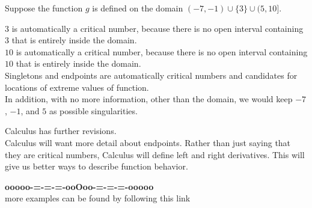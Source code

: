 \documentclass{ximera}
\begin{document}
\begin{example}


Suppose the function $g$ is defined on the domain $(-7, -1) \cup \{ 3 \} \cup (5, 10]$.

$3$ is automatically a critical number, because there is no open interval containing $3$ that is entirely inside the domain.\\

$10$ is automatically a critical number, because there is no open interval containing $10$ that is entirely inside the domain.\\



Singletons and endpoints are automatically critical numbers and candidates for locations of extreme values of function. \\




In addition, with no more information, other than the domain, we would keep $-7$, $-1$, and $5$ as possible singularities. \\




\end{example}



Calculus has further revisions.\\


Calculus will want more detail about endpoints.  Rather than just saying that they are critical numbers, Calculus will define left and right derivatives.  This will give us better ways to describe function behavior. \\













\begin{center}
\textbf{\textcolor{green!50!black}{ooooo-=-=-=-ooOoo-=-=-=-ooooo}} \\

more examples can be found by following this link\\ 

\end{center}
\end{document}
